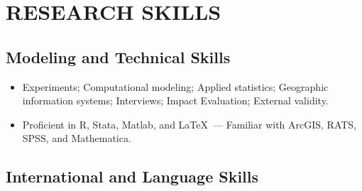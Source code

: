 \documentclass[10pt]{article}
\begin{document}
\section*{RESEARCH SKILLS}
\subsection*{Modeling and Technical Skills} \setlength{\itemsep}{1pt}
\begin{itemize}
\item Experiments; Computational modeling; Applied statistics; Geographic information systems; Interviews; Impact Evaluation; External validity.
\item Proficient in R, Stata, Matlab, and \LaTeX\ --- Familiar with ArcGIS, RATS, SPSS, and Mathematica.
\end{itemize}

\subsection*{International and Language Skills}

\end{document}

